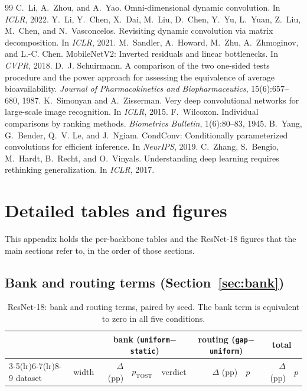 \documentclass[10pt,a4paper]{article}
\begin{document}
\begin{thebibliography}{99}
 C.~Li, A.~Zhou, and A.~Yao. Omni-dimensional dynamic convolution. In \emph{ICLR}, 2022.
 Y.~Li, Y.~Chen, X.~Dai, M.~Liu, D.~Chen, Y.~Yu, L.~Yuan, Z.~Liu, M.~Chen, and N.~Vasconcelos. Revisiting dynamic convolution via matrix decomposition. In \emph{ICLR}, 2021.
 M.~Sandler, A.~Howard, M.~Zhu, A.~Zhmoginov, and L.-C. Chen. MobileNetV2: Inverted residuals and linear bottlenecks. In \emph{CVPR}, 2018.
 D.~J. Schuirmann. A comparison of the two one-sided tests procedure and the power approach for assessing the equivalence of average bioavailability. \emph{Journal of Pharmacokinetics and Biopharmaceutics}, 15(6):657--680, 1987.
 K.~Simonyan and A.~Zisserman. Very deep convolutional networks for large-scale image recognition. In \emph{ICLR}, 2015.
 F.~Wilcoxon. Individual comparisons by ranking methods. \emph{Biometrics Bulletin}, 1(6):80--83, 1945.
 B.~Yang, G.~Bender, Q.~V. Le, and J.~Ngiam. CondConv: Conditionally parameterized convolutions for efficient inference. In \emph{NeurIPS}, 2019.
 C.~Zhang, S.~Bengio, M.~Hardt, B.~Recht, and O.~Vinyals. Understanding deep learning requires rethinking generalization. In \emph{ICLR}, 2017.
\end{thebibliography}

\clearpage
\appendix
\section{Detailed tables and figures}\label{app:detail}

This appendix holds the per-backbone tables and the ResNet-18 figures
that the main sections refer to, in the order of those sections.

\subsection{Bank and routing terms (Section~\ref{sec:bank})}

\begin{table}[!htbp]\centering\small
\caption{ResNet-18: bank and routing terms, paired by seed. The bank
term is equivalent to zero in all five conditions.}
\label{tab:decomp}
\begin{tabular}{l r rll rl rl}
\toprule
& & \multicolumn{3}{c}{bank (\texttt{uniform}$-$\texttt{static})}
& \multicolumn{2}{c}{routing (\texttt{gap}$-$\texttt{uniform})}
& \multicolumn{2}{c}{total} \\
\cmidrule(lr){3-5}\cmidrule(lr){6-7}\cmidrule(lr){8-9}
dataset & width & $\Delta$ (pp) & $p_{\text{TOST}}$ & verdict & $\Delta$ (pp) & $p$ & $\Delta$ (pp) & $p$ \\
\midrule
\bottomrule
\end{tabular}
\end{table}
\end{document}

